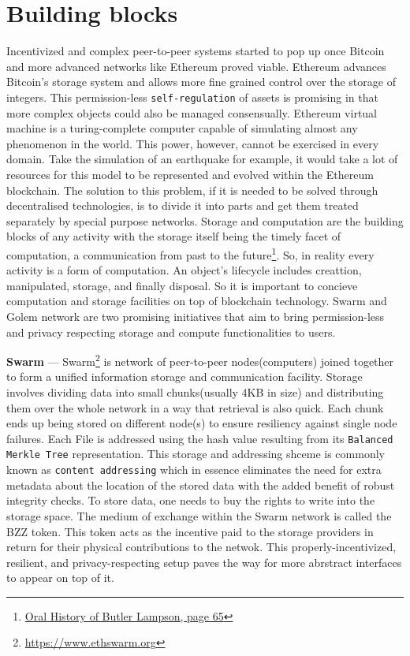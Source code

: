 \documentclass[a4paper, 10pt]{article}
\begin{document}
\section{Building blocks}
Incentivized and complex peer-to-peer systems started to pop up once Bitcoin and more advanced networks like Ethereum proved viable. Ethereum advances Bitcoin's storage system and allows more fine grained control over the storage of integers. This permission-less \texttt{self-regulation} of assets is promising in that more complex objects could also be managed consensually. Ethereum virtual machine is a turing-complete computer capable of simulating almost any phenomenon in the world. This power, however, cannot be exercised in every domain. Take the simulation of an earthquake for example, it would take a lot of resources for this model to be represented and evolved within the Ethereum blockchain. The solution to this problem, if it is needed to be solved through decentralised technologies, is to divide it into parts and get them treated separately by special purpose networks. Storage and computation are the building blocks of any activity with the storage itself being the timely facet of computation, a communication from past to the future\footnote{\href{https://www.computerhistory.org/collections/catalog/102658024}{Oral History of Butler Lampson, page 65}}. So, in reality every activity is a form of computation. An object's lifecycle includes creattion, manipulated, storage, and finally disposal. So it is important to concieve computation and storage facilities on top of blockchain technology. Swarm and Golem network are two promising initiatives that aim to bring permission-less and privacy respecting storage and compute functionalities to users.
\par
\textbf{Swarm} --- Swarm\footnote{\url{https://www.ethswarm.org}} is network of peer-to-peer nodes(computers) joined together to form a unified  information storage and communication facility. Storage involves dividing data into small chunks(usually 4KB in size) and distributing them over the whole network in a way that retrieval is also quick. Each chunk ends up being stored on different node(s) to ensure resiliency against single node failures. Each File is addressed using the hash value resulting from its \texttt{Balanced Merkle Tree} representation. This storage and addressing shceme is commonly known as \texttt{content addressing} which in essence eliminates the need for extra metadata about the location of the stored data with the added benefit of robust integrity checks. To store data, one needs to buy the rights to write into the storage space. The medium of exchange within the Swarm network is called the BZZ token. This token acts as the incentive paid to the storage providers in return for their physical contributions to the netwok. This properly-incentivized, resilient, and privacy-respecting setup paves the way for more abrstract interfaces to appear on top of it.
\end{document}
